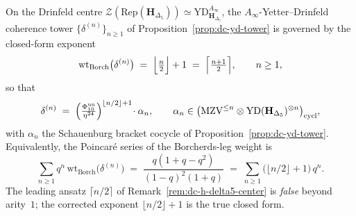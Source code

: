\begin{theorem}
\label{thm:dc-yd-closed-form}
On the Drinfeld centre
$\mathcal Z(\mathrm{Rep}(\mathbf H_{\Delta_5})) \simeq
\mathrm{YD}^{A_\infty}_{\mathbf H_{\Delta_5}}$, the
$A_\infty$-Yetter--Drinfeld coherence tower
$\{\delta^{(n)}\}_{n \geq 1}$ of
Proposition~\ref{prop:dc-yd-tower} is governed by the
closed-form exponent
\begin{equation}
\label{eq:dc-yd-closed-form-exponent}
 \mathrm{wt}_{\mathrm{Borch}}\bigl(\delta^{(n)}\bigr)
 \;=\;
 \Bigl\lfloor \tfrac{n}{2}\Bigr\rfloor + 1
 \;=\;
 \Bigl\lceil \tfrac{n+1}{2}\Bigr\rceil,
 \qquad n \geq 1,
\end{equation}
so that
\begin{equation}
\label{eq:dc-yd-closed-form}
 \delta^{(n)}
 \;=\;
 \Bigl(\tfrac{\Phi_{10}^{\mathrm{un}}}{\eta^{24}}\Bigr)^{\lfloor n/2\rfloor + 1}
 \!\cdot\alpha_n,
 \qquad
 \alpha_n
 \in
 \bigl(\mathrm{MZV}^{\leq n}\otimes
 \mathrm{YD}(\mathbf H_{\Delta_5})^{\otimes n}\bigr)_{\mathrm{cycl}},
\end{equation}
with $\alpha_n$ the Schauenburg bracket cocycle of
Proposition~\ref{prop:dc-yd-tower}. Equivalently, the
Poincar\'e series of the Borcherds-leg weight is
\begin{equation}
\label{eq:dc-yd-generating}
 \sum_{n \geq 1} q^n\,\mathrm{wt}_{\mathrm{Borch}}\bigl(\delta^{(n)}\bigr)
 \;=\;
 \frac{q(1 + q - q^2)}{(1 - q)^2 (1 + q)}
 \;=\;
 \sum_{n \geq 1}\bigl(\lfloor n/2\rfloor + 1\bigr)\, q^n.
\end{equation}
The leading ansatz $\lceil n/2\rceil$ of
Remark~\ref{rem:dc-h-delta5-center} is \emph{false} beyond
arity~$1$; the corrected exponent $\lfloor n/2\rfloor + 1$ is the true
closed form.
\end{theorem}

